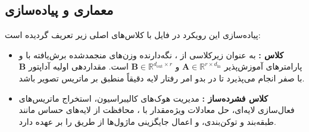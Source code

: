 \subsection{معماری و پیاده‌سازی}
پیاده‌سازی این رویکرد در فایل  با کلاس‌های اصلی زیر تعریف گردیده است:
\begin{itemize}
    \item \textbf{کلاس :} به عنوان زیرکلاسی از ، نگه‌دارنده وزن‌های منجمدشده برش‌یافته با  و پارامترهای آموزش‌پذیر $\mathbf{A} \in \mathbb{R}^{r \times d_{\text{in}}}$ و $\mathbf{B} \in \mathbb{R}^{d_{\text{out}} \times r}$ است. مقداردهی اولیه آداپتور $\mathbf{B}$ با صفر انجام می‌پذیرد تا در بدو امر رفتار لایه دقیقاً منطبق بر ماتریس تصویر باشد.
    \item \textbf{کلاس فشرده‌ساز :} مدیریت هوک‌های کالیبراسیون، استخراج ماتریس‌های فعال‌سازی لایه‌ای، حل معادلات ویژه‌مقدار با ، محافظت از لایه‌های حساس مانند طبقه‌بند و توکن‌بندی، و اعمال جایگزینی ماژول‌ها از طریق  را بر عهده دارد.
\end{itemize}
